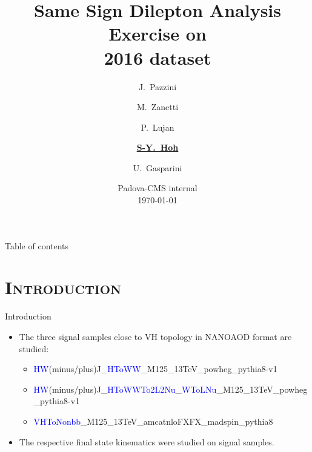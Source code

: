 \documentclass[xcolor=dvipsnames,compress]{beamer}
\title[Padova-CMS internal]{Same Sign Dilepton Analysis Exercise on \\ 2016 dataset}
\author[ \textbf{S.Y.Hoh}]
{
	J.~Pazzini\inst{1}
	\and
	M.~Zanetti\inst{1}
	\and
	P.~Lujan\inst{1}
	\and
	\underline{\textbf{S-Y.~Hoh\inst{1}}}
	\and
	U.~Gasparini\inst{1}
}
\institute[University of Padova]
{
\inst{1}{University of Padova}
}
\date[\today]
{Padova-CMS internal \\  \today}
\begin{document}

\begin{frame}
\titlepage
\end{frame}

\begin{frame}{Table of contents}
\tableofcontents
\end{frame}


\section{\scshape Introduction}
\begin{frame}{Introduction}
\begin{itemize}
\item{The three signal samples close to VH topology in NANOAOD format are studied: }
\begin{itemize}
\item{\textcolor{blue}{HW}(minus/plus)J\_\textcolor{blue}{HToWW}\_M125\_13TeV\_powheg\_pythia8-v1}
\item{\textcolor{blue}{HW}(minus/plus)J\_\textcolor{blue}{HToWWTo2L2Nu}\_\textcolor{blue}{WToLNu}\_M125\_13TeV\_powheg\_pythia8-v1}
\item{\textcolor{blue}{VHToNonbb}\_M125\_13TeV\_amcatnloFXFX\_madspin\_pythia8}
\end{itemize}
\item{The respective final state kinematics were studied on signal samples.}
\end{itemize}
\end{frame}
\end{document}
